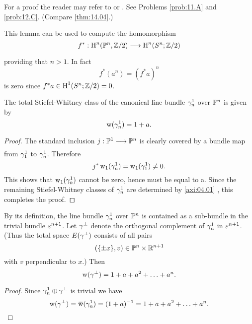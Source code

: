 \documentclass[../main]{subfiles}
\begin{document}
For a proof the reader may refer to \cite[$\S$ 4.3.3]{hilton1961} or \cite[p. 264]{spanier1981}. See Problems \ref{prob:11.A} and \ref{prob:12.C}. (Compare \ref{thm:14.04}.)

\begin{remark}
\label{rem:04.02}
This lemma can be used to compute the homomorphism
\[
f^*: \homology^n(\projective^{n}, \mathbb{Z} / 2) \varrightarrow{} \homology^n(S^n ; \mathbb{Z} / 2)
\]
providing that $n>1$. In fact
\[
f^*(a^n)=(f^* a)^n
\]
is zero since $f^* a \in \operatorname{H}^1(S^n ; \mathbb{Z} / 2)=0$.
\end{remark}

\begin{example}
\label{exa:04.02}
The total Stiefel-Whitney class of the canonical line bundle $\gamma_{n}^{1}$ over $\mathbb{P}^{n}$ is given by
\[
\operatorname{w}(\gamma_{n}^{1})=1+a .
\]
\end{example}

\begin{proof}
The standard inclusion $j: \projective^1 \varrightarrow{} \projective^n$ is clearly covered by a bundle map from $\gamma_1^1$ to $\gamma_{n}^1$. Therefore
\[
j^* \operatorname{w}_1(\gamma_n^1)=\operatorname{w}_1(\gamma_1^1) \neq 0 .
\]
This shows that $\operatorname{w}_1(\gamma_n^1)$ cannot be zero, hence must be equal to a. Since the remaining Stiefel-Whitney classes of $\gamma_n^1$ are determined by \ref{axi:04.01} , this completes the proof.
\end{proof}

\begin{example}
\label{exa:04.03}
By its definition, the line bundle $\gamma_n^1$ over $\mathbb{P}^n$ is contained as a \mbox{sub-bundle} in the trivial bundle $\varepsilon^{n+1}$. Let $\gamma^{\perp}$ denote the orthogonal \mbox{complement} of $\gamma_{n}^{1}$ in $\varepsilon^{n+1}$. (Thus the total space $E(\gamma^{\perp})$ consists of all pairs
\[
(\{\pm x\}, v) \in \mathbb{P}^{n} \times \mathbb{R}^{n+1}
\]
with $v$ perpendicular to $x$.) Then
\[
\operatorname{w}(\gamma^{\perp})=1+a+a^2+\ldots+a^n .
\]
\end{example}

\begin{proof}
Since $\gamma_{n}^{1} \oplus \gamma^{\perp}$ is trivial we have
\[
\sw(\tautological^{\perp})=\xoverline{\sw}(\tautological_n^1)=(1+a)^{-1}=1+a+a^2+\ldots+a^n .
\]
\end{proof}
\end{document}
